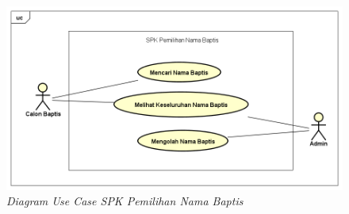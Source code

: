 	\begin{figure}[htbp]
		\centering
			\includegraphics[scale=0.7]{Gambar/usecase.PNG}
			\caption{\textit{Diagram \textit{Use Case} SPK Pemilihan Nama Baptis}}
		\label{fig:usecase}
	\end{figure}

